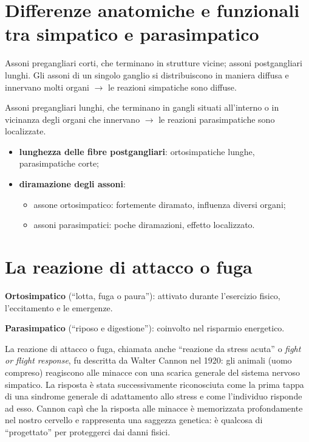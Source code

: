 \section{Differenze anatomiche e funzionali tra simpatico e parasimpatico}

Assoni pregangliari corti, che terminano in strutture vicine; assoni
postgangliari lunghi. Gli assoni di un singolo ganglio si distribuiscono in
maniera diffusa e innervano molti organi $\rightarrow$ le reazioni
simpatiche sono diffuse.

Assoni pregangliari lunghi, che terminano in gangli situati all'interno o
in vicinanza degli organi che innervano $\rightarrow$ le reazioni
parasimpatiche sono localizzate.

\begin{itemize}
  \item \textbf{lunghezza delle fibre postgangliari}: ortosimpatiche
    lunghe, parasimpatiche corte;
  \item \textbf{diramazione degli assoni}:
  \begin{itemize}
    \item assone ortosimpatico: fortemente diramato, influenza diversi
      organi;
    \item assoni parasimpatici: poche diramazioni, effetto localizzato.
  \end{itemize}
\end{itemize}

\section{La reazione di attacco o fuga}

\textbf{Ortosimpatico} (``lotta, fuga o paura''): attivato durante
l'esercizio fisico, l'eccitamento e le emergenze.

\textbf{Parasimpatico} (``riposo e digestione''): coinvolto nel risparmio
energetico.

La reazione di attacco o fuga, chiamata anche ``reazione da stress acuta''
o \textit{fight or flight response}, fu descritta da Walter Cannon nel
1920: gli animali (uomo compreso) reagiscono alle minacce con una scarica
generale del sistema nervoso simpatico. La risposta è stata
successivamente riconosciuta come la prima tappa di una sindrome generale
di adattamento allo stress e come l'individuo risponde ad esso. Cannon
capì che la risposta alle minacce è memorizzata profondamente nel nostro
cervello e rappresenta una saggezza genetica: è qualcosa di ``progettato''
per proteggerci dai danni fisici.

